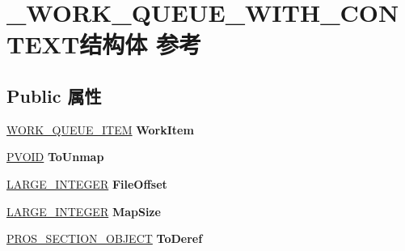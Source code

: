 \hypertarget{struct___w_o_r_k___q_u_e_u_e___w_i_t_h___c_o_n_t_e_x_t}{}\section{\+\_\+\+W\+O\+R\+K\+\_\+\+Q\+U\+E\+U\+E\+\_\+\+W\+I\+T\+H\+\_\+\+C\+O\+N\+T\+E\+X\+T结构体 参考}
\label{struct___w_o_r_k___q_u_e_u_e___w_i_t_h___c_o_n_t_e_x_t}
\subsection*{Public 属性}
\begin{DoxyCompactItemize}
\item 
\mbox{\label{struct___w_o_r_k___q_u_e_u_e___w_i_t_h___c_o_n_t_e_x_t_a7e9b10edbb9f4effbfbd2018a63e8594}} 
\hyperlink{struct___w_o_r_k___q_u_e_u_e___i_t_e_m}{W\+O\+R\+K\+\_\+\+Q\+U\+E\+U\+E\+\_\+\+I\+T\+EM} {\bfseries Work\+Item}
\item 
\mbox{\label{struct___w_o_r_k___q_u_e_u_e___w_i_t_h___c_o_n_t_e_x_t_a41667128d8558922309e5303b6225632}} 
\hyperlink{interfacevoid}{P\+V\+O\+ID} {\bfseries To\+Unmap}
\item 
\mbox{\label{struct___w_o_r_k___q_u_e_u_e___w_i_t_h___c_o_n_t_e_x_t_a9c3d30da881617c98f74eb695d1d175b}} 
\hyperlink{union___l_a_r_g_e___i_n_t_e_g_e_r}{L\+A\+R\+G\+E\+\_\+\+I\+N\+T\+E\+G\+ER} {\bfseries File\+Offset}
\item 
\mbox{\label{struct___w_o_r_k___q_u_e_u_e___w_i_t_h___c_o_n_t_e_x_t_ae83807b8f3d7d47c4c9cf43242e1ece3}} 
\hyperlink{union___l_a_r_g_e___i_n_t_e_g_e_r}{L\+A\+R\+G\+E\+\_\+\+I\+N\+T\+E\+G\+ER} {\bfseries Map\+Size}
\item 
\mbox{\label{struct___w_o_r_k___q_u_e_u_e___w_i_t_h___c_o_n_t_e_x_t_a4c8decf57bc6a60da0cbbf644ccda868}} 
\hyperlink{struct___r_o_s___s_e_c_t_i_o_n___o_b_j_e_c_t}{P\+R\+O\+S\+\_\+\+S\+E\+C\+T\+I\+O\+N\+\_\+\+O\+B\+J\+E\+CT} {\bfseries To\+Deref}

\end{DoxyCompactItemize}
